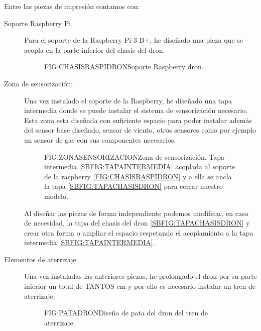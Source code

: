 \begin{description}
Entre las piezas de impresión contamos con:
\begin{description}
\item[Soporte Raspberry Pi]
Para el soporte de la Raspberry Pi 3 B+, he diseñado una pieza que se acopla en la parte inferior del chasis del dron. 

\begin{figure}[Chasis raspberry dron]{FIG:CHASISRASPIDRON}{Soporte Raspberry dron.}
\end{figure}

\item[Zona de sensorización: ]

Una vez instalado el soporte de la Raspberry, he diseñado una tapa intermedia donde se puede instalar el sistema de sensorización necesario. 
Esta zona esta diseñada con suficiente espacio para poder instalar además del sensor base diseñado, sensor de viento, otros sensores como por ejemplo un sensor de gas con sus componentes necesarios.

\begin{figure}[Zona sensorización dron]{FIG:ZONASENSORIZACION}{Zona de sensorización. Tapa intermedia \ref{SBFIG:TAPAINTERMEDIA} acoplada al soporte de la raspberry \ref{FIG:CHASISRASPIDRON} y a ella se ancla la tapa \ref{SBFIG:TAPACHASISDRON} para cerrar nuestro modelo.}
	
   \quad
  
\end{figure} 

Al diseñar las piezas de forma independiente podemos modificar, en caso de necesidad, la tapa del chasis del dron \ref{SBFIG:TAPACHASISDRON} y crear otra forma o ampliar el espacio respetando el acoplamiento a la tapa intermedia  \ref{SBFIG:TAPAINTERMEDIA}.

\item[Elementos de aterrizaje]

Una vez instaladas las anteriores piezas, he prolongado el dron por su parte inferior un total de TANTOS cm y por ello es necesario instalar un tren de aterrizaje.

\begin{figure}[Pata dron]{FIG:PATADRON}{Diseño de pata del dron del tren de aterrizaje.}
\end{figure}
\end{description}


\end{description}
